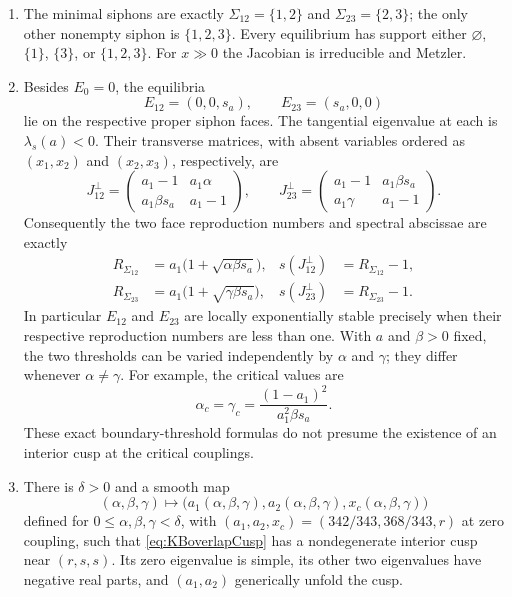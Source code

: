 \begin{enumerate}
\item The minimal siphons are exactly
$\Sigma_{12}=\{1,2\}$ and $\Sigma_{23}=\{2,3\}$;
the only other nonempty siphon is $\{1,2,3\}$.
Every equilibrium has support either $\varnothing$,
$\{1\}$, $\{3\}$, or $\{1,2,3\}$.
For $x\gg0$ the Jacobian is irreducible and Metzler.

\item Besides $E_0=0$, the equilibria
\[
 E_{12}=(0,0,s_a),\qquad E_{23}=(s_a,0,0)
\]
lie on the respective proper siphon faces. The tangential
eigenvalue at each is $\lambda_s(a)<0$. Their transverse
matrices, with absent variables ordered as $(x_1,x_2)$ and
$(x_2,x_3)$, respectively, are
\begin{equation}\label{eq:KBoverlapJtra}
 J_{12}^\perp=\begin{pmatrix}
 a_1-1&a_1\alpha\\ a_1\beta s_a&a_1-1
 \end{pmatrix},\qquad
 J_{23}^\perp=\begin{pmatrix}
 a_1-1&a_1\beta s_a\\ a_1\gamma&a_1-1
 \end{pmatrix}.
\end{equation}
Consequently the two face reproduction numbers and spectral
abscissae are exactly
\begin{equation}\label{eq:KBoverlapR}
\begin{aligned}
 R_{\Sigma_{12}}&=a_1\bigl(1+\sqrt{\alpha\beta s_a}\bigr),&
 s(J_{12}^\perp)&=R_{\Sigma_{12}}-1,\\
 R_{\Sigma_{23}}&=a_1\bigl(1+\sqrt{\gamma\beta s_a}\bigr),&
 s(J_{23}^\perp)&=R_{\Sigma_{23}}-1.
\end{aligned}
\end{equation}
In particular $E_{12}$ and $E_{23}$ are locally
exponentially stable precisely when their respective
reproduction numbers are less than one. With $a$ and
$\beta>0$ fixed, the two thresholds can be varied
independently by $\alpha$ and $\gamma$; they differ whenever
$\alpha\ne\gamma$. For example, the critical values are
\[
 \alpha_c=\gamma_c=
 \frac{(1-a_1)^2}{a_1^2\beta s_a}.
\]
These exact boundary-threshold formulas do not presume the
existence of an interior cusp at the critical couplings.

\item There is $\delta>0$ and a smooth map
\[
 (\alpha,\beta,\gamma)\longmapsto
 \bigl(a_1(\alpha,\beta,\gamma),
       a_2(\alpha,\beta,\gamma),
       x_c(\alpha,\beta,\gamma)\bigr)
\]
defined for $0\le\alpha,\beta,\gamma<\delta$,
with $(a_1,a_2,x_c)=(342/343,368/343,r)$ at zero
coupling, such that \eqref{eq:KBoverlapCusp} has a
nondegenerate interior cusp near $(r,s,s)$. Its zero
eigenvalue is simple, its other two eigenvalues have
negative real parts, and $(a_1,a_2)$ generically unfold
the cusp.


\end{enumerate}
